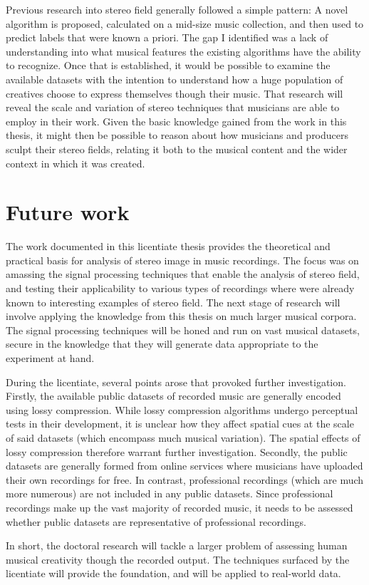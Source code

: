 Previous research into stereo field generally followed a simple pattern: A novel algorithm is proposed, calculated on a mid-size music collection, and then used to predict labels that were known a priori. The gap I identified was a lack of understanding into what musical features the existing algorithms have the ability to recognize. Once that is established, it would be possible to examine the available datasets with the intention to understand how a huge population of creatives choose to express themselves though their music. That research will reveal the scale and variation of stereo techniques that musicians are able to employ in their work. Given the basic knowledge gained from the work in this thesis, it might then be possible to reason about how musicians and producers sculpt their stereo fields, relating it both to the musical content and the wider context in which it was created.

\newpage

\section{Future work}
\label{sec:future_work}

The work documented in this licentiate thesis provides the theoretical and practical basis for analysis of stereo image in music recordings. The focus was on amassing the signal processing techniques that enable the analysis of stereo field, and testing their applicability to various types of recordings where were already known to interesting examples of stereo field. The next stage of research will involve applying the knowledge from this thesis on much larger musical corpora. The signal processing techniques will be honed and run on vast musical datasets, secure in the knowledge that they will generate data appropriate to the experiment at hand.

During the licentiate, several points arose that provoked further investigation. Firstly, the available public datasets of recorded music are generally encoded using lossy compression. While lossy compression algorithms undergo perceptual tests in their development, it is unclear how they affect spatial cues at the scale of said datasets (which encompass much musical variation). The spatial effects of lossy compression therefore warrant further investigation. Secondly, the public datasets are generally formed from online services where musicians have uploaded their own recordings for free. In contrast, professional recordings (which are much more numerous) are not included in any public datasets. Since professional recordings make up the vast majority of recorded music, it needs to be assessed whether public datasets are representative of professional recordings.

In short, the doctoral research will tackle a larger problem of assessing human musical creativity though the recorded output. The techniques surfaced by the licentiate will provide the foundation, and will be applied to real-world data.